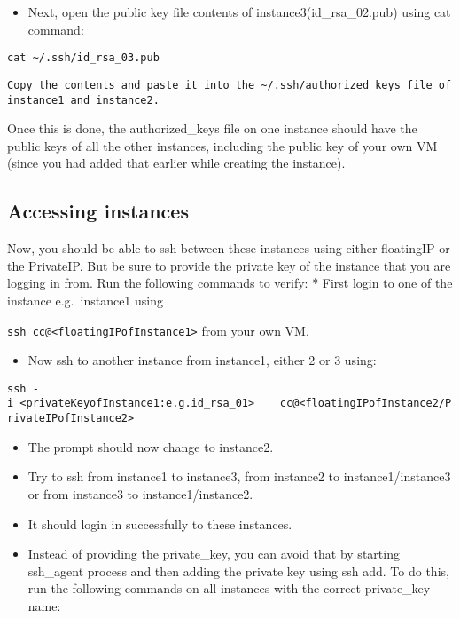 \begin{itemize}
\item
  Next, open the public key file contents of instance3(id\_rsa\_02.pub)
  using cat command:
\end{itemize}

\texttt{cat\ \textasciitilde{}/.ssh/id\_rsa\_03.pub}

\begin{lstlisting}
Copy the contents and paste it into the ~/.ssh/authorized_keys file of
instance1 and instance2.
\end{lstlisting}

Once this is done, the authorized\_keys file on one instance should have
the public keys of all the other instances, including the public key of
your own VM (since you had added that earlier while creating the
instance).

\subsection{Accessing instances}

Now, you should be able to ssh between these instances using either
floatingIP or the PrivateIP. But be sure to provide the private key of
the instance that you are logging in from. Run the following commands to
verify: * First login to one of the instance e.g.~instance1 using

\texttt{ssh\ cc@\textless{}floatingIPofInstance1\textgreater{}} from
your own VM.

\begin{itemize}
\item
  Now ssh to another instance from instance1, either 2 or 3 using:
\end{itemize}

\texttt{ssh\ -i\ \textless{}privateKeyofInstance1:e.g.id\_rsa\_01\textgreater{}\ \ \ \ cc@\textless{}floatingIPofInstance2/PrivateIPofInstance2\textgreater{}}

\begin{itemize}
\item
  The prompt should now change to instance2.
\item
  Try to ssh from instance1 to instance3, from instance2 to
  instance1/instance3 or from instance3 to instance1/instance2.
\item
  It should login in successfully to these instances.
\item
  Instead of providing the private\_key, you can avoid that by starting
  ssh\_agent process and then adding the private key using ssh add. To
  do this, run the following commands on all instances with the correct
  private\_key name:
\end{itemize}

